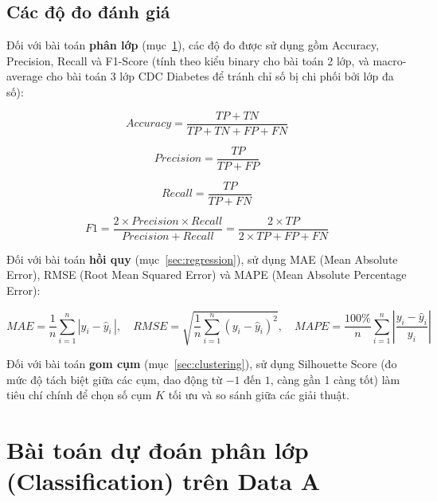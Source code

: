 \subsection{Các độ đo đánh giá}

Đối với bài toán \textbf{phân lớp} (mục~\ref{sec:classification}), các độ đo được sử dụng gồm Accuracy, Precision, Recall và F1-Score (tính theo kiểu binary cho bài toán 2 lớp, và macro-average cho bài toán 3 lớp CDC Diabetes để tránh chỉ số bị chi phối bởi lớp đa số):

\begin{equation}\label{eq:acc}
Accuracy = \frac{TP+TN}{TP+TN+FP+FN}
\end{equation}

\begin{equation}
Precision = \frac{TP}{TP+FP}
\end{equation}

\begin{equation}
Recall = \frac{TP}{TP+FN}
\end{equation}

\begin{equation}
F1 = \frac{2 \times Precision \times Recall}{Precision+Recall} = \frac{2 \times TP}{2 \times TP+FP+FN}
\end{equation}

Đối với bài toán \textbf{hồi quy} (mục~\ref{sec:regression}), sử dụng MAE (Mean Absolute Error), RMSE (Root Mean Squared Error) và MAPE (Mean Absolute Percentage Error):

\begin{equation}
MAE = \frac{1}{n}\sum_{i=1}^{n}|y_i - \hat{y}_i\,|, \quad
RMSE = \sqrt{\frac{1}{n}\sum_{i=1}^{n}(y_i - \hat{y}_i)^2}, \quad
MAPE = \frac{100\%}{n}\sum_{i=1}^{n}\left|\frac{y_i - \hat{y}_i}{y_i}\right|
\end{equation}

Đối với bài toán \textbf{gom cụm} (mục~\ref{sec:clustering}), sử dụng Silhouette Score (đo mức độ tách biệt giữa các cụm, dao động từ $-1$ đến $1$, càng gần 1 càng tốt) làm tiêu chí chính để chọn số cụm $K$ tối ưu và so sánh giữa các giải thuật.


\section{Bài toán dự đoán phân lớp (Classification) trên Data A}
\label{sec:classification}

